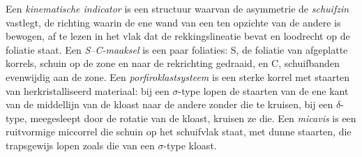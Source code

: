 \begin{definition}\label{def:b3:deformation-mechanisms:kinematic}
Een \emph{kinematische indicator} is een structuur waarvan de
asymmetrie de \emph{schuifzin} vastlegt, de richting waarin de ene wand van een
 ten opzichte van de andere is bewogen, af te lezen in het vlak dat de rekkingslineatie
bevat en loodrecht op de foliatie staat.
Een \emph{S--C-maaksel} is een paar foliaties: S, de
foliatie van afgeplatte korrels, schuin op de zone en naar de
rekrichting gedraaid, en C, schuifbanden evenwijdig aan de zone. Een
\emph{porfiroklastsysteem} is een sterke korrel met
staarten van herkristalliseerd materiaal: bij een $\sigma$-type lopen de staarten van de ene
kant van de middellijn van de kloast naar de andere zonder die te kruisen, bij een $\delta$-type,
meegesleept door de rotatie van de kloast, kruisen ze die. Een
\emph{micavis} is een ruitvormige miccorrel die schuin op
het schuifvlak staat, met dunne staarten, die trapsgewijs lopen zoals die van een $\sigma$-type kloast.
\end{definition}

